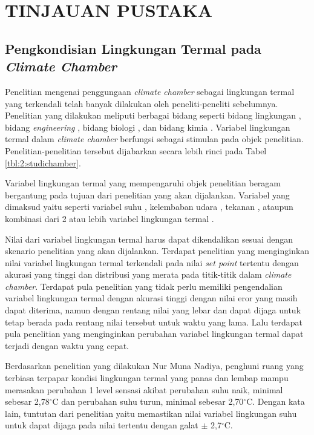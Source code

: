 \chapter{TINJAUAN PUSTAKA}
\label{pustaka}

\section{Pengkondisian Lingkungan Termal pada \textit{Climate Chamber}}

Penelitian mengenai penggungaan \textit{climate chamber} sebagai lingkungan termal yang terkendali telah banyak dilakukan oleh peneliti-peneliti sebelumnya. Penelitian yang dilakukan meliputi berbagai bidang seperti bidang lingkungan \cite{article2.1:1} \cite{article2.1:2} \cite{article2.1:4}, bidang \textit{engineering} \cite{article2.1:5}, bidang biologi \cite{article2.1:6}\cite{article2.1:7}, dan bidang kimia \cite{article2.1:8}. Variabel lingkungan termal dalam \textit{climate chamber} berfungsi sebagai stimulan pada objek penelitian. Penelitian-penelitian tersebut dijabarkan secara lebih rinci pada Tabel \ref{tbl:2:studichamber}.

Variabel lingkungan termal yang mempengaruhi objek penelitian beragam bergantung pada tujuan dari penelitian yang akan dijalankan. Variabel yang dimaksud yaitu seperti variabel suhu \cite{article2.1:5}\cite{article2.1:6}\cite{article2.1:7}\cite{article2.1:8}\cite{article2.1:9}, kelembaban udara \cite{article2.1:8}, tekanan \cite{article2.1:4}, ataupun kombinasi dari 2 atau lebih variabel lingkungan termal \cite{article2.1:8}.

Nilai dari variabel lingkungan termal harus dapat dikendalikan sesuai dengan skenario penelitian yang akan dijalankan. Terdapat penelitian yang menginginkan nilai variabel lingkungan termal terkendali pada nilai \textit{set point} tertentu dengan akurasi yang tinggi dan distribusi yang merata pada titik-titik dalam \textit{climate chamber}. Terdapat pula penelitian yang tidak perlu memiliki pengendalian variabel lingkungan termal dengan akurasi tinggi dengan nilai eror yang masih dapat diterima, namun dengan rentang nilai yang lebar dan dapat dijaga untuk tetap berada pada rentang nilai tersebut untuk waktu yang lama. Lalu terdapat pula penelitian yang menginginkan perubahan variabel lingkungan termal dapat terjadi dengan waktu yang cepat.

Berdasarkan penelitian yang dilakukan Nur Muna Nadiya\cite{skripsiMuna}, penghuni ruang yang terbiasa terpapar kondisi lingkungan termal yang panas dan lembap mampu merasakan perubahan 1 level sensasi akibat perubahan suhu naik, minimal sebesar 2,78$^{\circ}$C dan perubahan suhu turun, minimal sebesar 2,70$^{\circ}$C. Dengan kata lain, tuntutan dari penelitian yaitu memastikan nilai variabel lingkungan suhu untuk dapat dijaga pada nilai tertentu dengan galat $\pm$ 2,7$^{\circ}$C.

